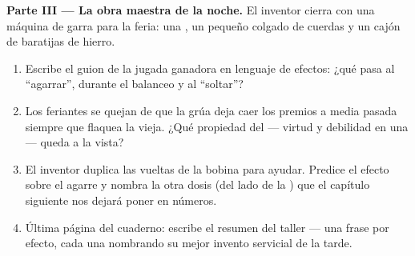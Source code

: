\begin{problem}
\medskip\noindent\textbf{Parte III --- La obra maestra de la noche.}
El inventor cierra con una máquina de garra para la feria: una
, un pequeño  colgado de cuerdas y un cajón de
baratijas de hierro.
\begin{enumerate}[resume]
  \item Escribe el guion de la jugada ganadora en lenguaje de
        efectos: ¿qué pasa al ``agarrar'', durante el balanceo y al
        ``soltar''?
  \item Los feriantes se quejan de que la grúa deja caer los premios
        a media pasada siempre que flaquea la  vieja. ¿Qué
        propiedad del  --- virtud y debilidad en una
        --- queda a la vista?
  \item El inventor duplica las vueltas de la bobina para ayudar.
        Predice el efecto sobre el agarre y nombra la otra dosis (del
        lado de la ) que el capítulo siguiente nos dejará
        poner en números.
  \item Última página del cuaderno: escribe el resumen del taller
        --- una frase por efecto, cada una nombrando su mejor
        invento servicial de la tarde.
\end{enumerate}
\end{problem}
